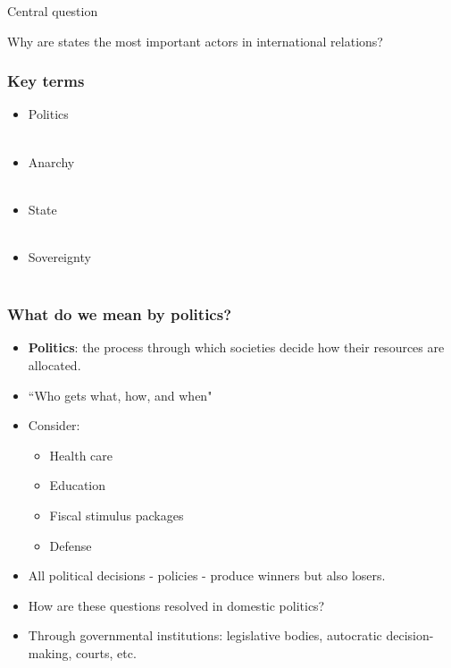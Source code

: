 \documentclass[handout]{beamer}
\begin{document}
\begin{frame}{\LARGE Central question}
\begin{center}
\LARGE Why are states the most important actors in international relations?
    \end{center}
\end{frame}

\begin{frame} 
\frametitle{\LARGE{Key terms}}
\begin{itemize}
    \item Politics
   	\\~\\
   	\item Anarchy
   	\\~\\
   	\item State
   	\\~\\
   	\item Sovereignty
   	\\~\\
\end{itemize}
\end{frame}

\begin{frame} 
\frametitle{\LARGE{What do we mean by politics?}}
\begin{itemize}
    \item \textbf{Politics}: the process through which societies decide how their resources are allocated.
    \item ``Who gets what, how, and when" \pause
    \item Consider: \pause
    \begin{itemize}
        \item Health care \pause
        \item Education \pause
        \item Fiscal stimulus packages \pause 
        \item Defense \pause
    \end{itemize}
    \item All political decisions - policies - produce winners but also losers. \pause
    \item How are these questions resolved in domestic politics? \pause
    \item Through governmental institutions: legislative bodies, autocratic decision-making, courts, etc. 
\end{itemize}
\end{frame}
\end{document}
